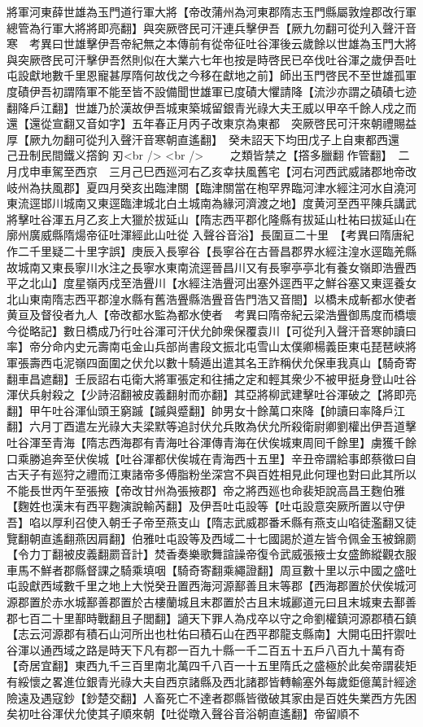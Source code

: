 將軍河東薛世雄為玉門道行軍大將【帝改蒲州為河東郡隋志玉門縣屬敦煌郡改行軍總管為行軍大將將即亮翻】與突厥啓民可汗連兵擊伊吾【厥九勿翻可從刋入聲汗音寒　考異曰世雄擊伊吾帝紀無之本傳前有從帝征吐谷渾後云歲餘以世雄為玉門大將與突厥啓民可汗擊伊吾然則似在大業六七年也按是時啓民已卒伐吐谷渾之歲伊吾吐屯設獻地數千里恩寵甚厚隋何故伐之今移在獻地之前】師出玉門啓民不至世雄孤軍度磧伊吾初謂隋軍不能至皆不設備聞世雄軍已度磧大懼請降【流沙亦謂之磧磧七迹翻降戶江翻】世雄乃於漢故伊吾城東築城留銀青光祿大夫王威以甲卒千餘人戍之而還【還從宣翻又音如字】五年春正月丙子改東京為東都　突厥啓民可汗來朝禮賜益厚【厥九勿翻可從刋入聲汗音寒朝直遙翻】　癸未詔天下均田戊子上自東都西還　己丑制民間鐵义撘鉤刃<br />
<br />
　　之類皆禁之【撘多臘翻作管翻】　二月戊申車駕至西京　三月己巳西廵河右乙亥幸扶風舊宅【河右河西武威諸郡地帝改岐州為扶風郡】夏四月癸亥出臨津關【臨津關當在枹罕界臨河津水經注河水自澆河東流逕邯川城南又東逕臨津城北白土城南為緣河濟渡之地】度黄河至西平陳兵講武將擊吐谷渾五月乙亥上大獵於拔延山【隋志西平郡化隆縣有拔延山杜祐曰拔延山在廓州廣威縣隋煬帝征吐渾經此山吐從入聲谷音浴】長圍亘二十里　【考異曰隋唐紀作二千里疑二十里字誤】庚辰入長寧谷【長寧谷在古晉昌郡界水經注湟水逕臨羌縣故城南又東長寧川水注之長寧水東南流逕晉昌川又有長寧亭亭北有養女嶺即浩舋西平之北山】度星嶺丙戍至浩舋川【水經注浩舋河出塞外逕西平之鮮谷塞又東逕養女北山東南隋志西平郡湟水縣有舊浩舋縣浩舋音告門浩又音閤】以橋未成斬都水使者黄亘及督役者九人【帝改都水監為都水使者　考異曰隋帝紀云梁浩舋御馬度而橋壞今從略記】數日橋成乃行吐谷渾可汗伏允帥衆保覆袁川【可從刋入聲汗音寒帥讀曰率】帝分命内史元壽南屯金山兵部尚書段文振北屯雪山太僕卿楊義臣東屯琵琶峽將軍張壽西屯泥嶺四面圍之伏允以數十騎遁出遣其名王詐稱伏允保車我真山【騎奇寄翻車昌遮翻】壬辰詔右屯衛大將軍張定和往捕之定和輕其衆少不被甲挺身登山吐谷渾伏兵射殺之【少詩沼翻被皮義翻射而亦翻】其亞將柳武建擊吐谷渾破之【將即亮翻】甲午吐谷渾仙頭王窮䠞【䠞與蹙翻】帥男女十餘萬口來降【帥讀曰率降戶江翻】六月丁酉遣左光祿大夫梁默等追討伏允兵敗為伏允所殺衛尉卿劉權出伊吾道擊吐谷渾至青海【隋志西海郡有青海吐谷渾傳青海在伏俟城東周囘千餘里】虜獲千餘口乘勝追奔至伏俟城【吐谷渾都伏俟城在青海西十五里】辛丑帝謂給事郎蔡徵曰自古天子有廵狩之禮而江東諸帝多傅脂粉坐深宫不與百姓相見此何理也對曰此其所以不能長世丙午至張掖【帝改甘州為張掖郡】帝之將西廵也命裴矩說高昌王麴伯雅【麴姓也漢末有西平麴演說輸芮翻】及伊吾吐屯設等【吐屯設意突厥所置以守伊吾】啗以厚利召使入朝壬子帝至燕支山【隋志武威郡番禾縣有燕支山啗徒濫翻又徒覽翻朝直遙翻燕因肩翻】伯雅吐屯設等及西域二十七國謁於道左皆令佩金玉被錦罽【令力丁翻被皮義翻罽音計】焚香奏樂歌舞諠譟帝復令武威張掖士女盛飾縱觀衣服車馬不鮮者郡縣督課之騎乘填咽【騎奇寄翻乘繩證翻】周亘數十里以示中國之盛吐屯設獻西域數千里之地上大悦癸丑置西海河源鄯善且末等郡【西海郡置於伏俟城河源郡置於赤水城鄯善郡置於古樓蘭城且末郡置於古且末城酈道元曰且末城東去鄯善郡七百二十里鄯時戰翻且子閭翻】讁天下罪人為戍卒以守之命劉權鎮河源郡積石鎮【志云河源郡有積石山河所出也杜佑曰積石山在西平郡龍支縣南】大開屯田扞禦吐谷渾以通西域之路是時天下凡有郡一百九十縣一千二百五十五戶八百九十萬有奇【奇居宜翻】東西九千三百里南北萬四千八百一十五里隋氏之盛極於此矣帝謂裴矩有綏懷之畧進位銀青光祿大夫自西京諸縣及西北諸郡皆轉輸塞外每歲鉅億萬計經途險遠及遇寇鈔【鈔楚交翻】人畜死亡不達者郡縣皆徵破其家由是百姓失業西方先困矣初吐谷渾伏允使其子順來朝【吐從暾入聲谷音浴朝直遙翻】帝留順不